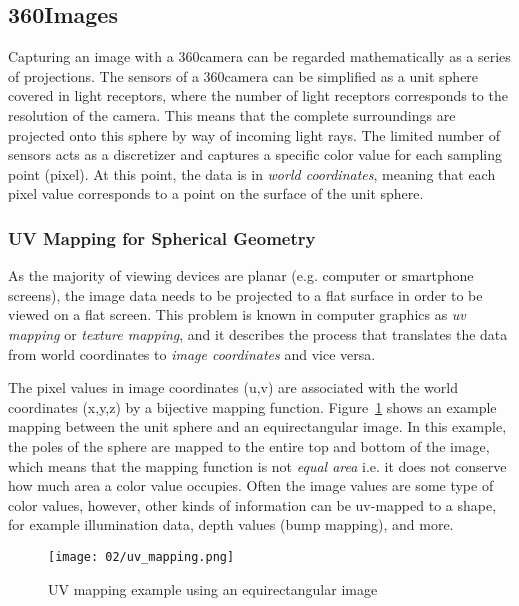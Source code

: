 \subsection{360\degree Images}\label{subsec:fundamentals_360}
Capturing an image with a 360\degree camera can be regarded mathematically as a series of projections. The sensors of a 360\degree camera can be simplified as a unit sphere covered in light receptors, where the number of light receptors corresponds to the resolution of the camera. This means that the complete surroundings are projected onto this sphere by way of incoming light rays. The limited number of sensors acts as a discretizer and captures a specific color value for each sampling point (pixel). At this point, the data is in \emph{world coordinates}, meaning that each pixel value corresponds to a point on the surface of the unit sphere. 

\subsubsection{UV Mapping for Spherical Geometry}
As the majority of viewing devices are planar (e.g. computer or smartphone screens), the image data needs to be projected to a flat surface in order to be viewed on a flat screen. This problem is known in computer graphics as \emph{uv mapping} or \emph{texture mapping}, and it describes the process that translates the data from world coordinates to \emph{image coordinates} and vice versa.

The pixel values in image coordinates (u,v) are associated with the world coordinates (x,y,z) by a bijective mapping function. Figure~\ref{fig:uv_mapping} shows an example mapping between the unit sphere and an equirectangular image. In this example, the poles of the sphere are mapped to the entire top and bottom of the image, which means that the mapping function is not \emph{equal area} i.e. it does not conserve how much area a color value occupies. Often the image values are some type of color values, however, other kinds of information can be uv-mapped to a shape, for example illumination data, depth values (bump mapping), and more.

\begin{figure}
		\centering
		\texttt{[image: 02/uv\_mapping.png]}
		\caption[UV mapping example]{UV mapping example using an equirectangular image}
		\label{fig:uv_mapping}
\end{figure}

